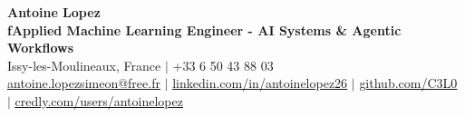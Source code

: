 \documentclass[letterpaper,10pt]{article}
\begin{document}
\begin{center}
    {\Huge \textbf{Antoine Lopez}} \\ \vspace{2pt}
    {\large \textbf{fApplied Machine Learning Engineer - AI Systems \& Agentic Workflows}} \\ \vspace{3pt}
    \small
    Issy-les-Moulineaux, France $|$ +33 6 50 43 88 03 \\
    \href{mailto:antoine.lopezsimeon@free.fr}{\underline{antoine.lopezsimeon@free.fr}} $|$ 
    \href{https://linkedin.com/in/antoinelopez26}{\underline{linkedin.com/in/antoinelopez26}} $|$
    \href{https://github.com/C3L0}{\underline{github.com/C3L0}} $|$
    \href{https://www.credly.com/users/antoinelopez26}{\underline{credly.com/users/antoinelopez}}
\end{center}

\vspace{-10pt}







\end{document}
